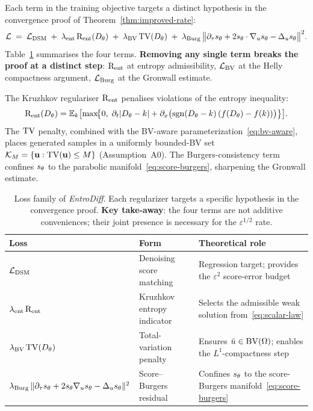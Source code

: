 Each term in the training objective targets a distinct hypothesis in the convergence proof of Theorem~\ref{thm:improved-rate}:
\begin{equation}
  \label{eq:loss-final}
  \mathcal{L} \;=\;
    \mathcal{L}_{\mathrm{DSM}}
    \;+\;
    \lambda_{\mathrm{ent}}\,\mathrm{R}_{\mathrm{ent}}(D_{\theta})
    \;+\;
    \lambda_{\mathrm{BV}}\,\mathrm{TV}(D_{\theta})
    \;+\;
    \lambda_{\mathrm{Burg}}\,
      \bigl\|\partial_{\tau}s_{\theta} + 2s_{\theta}\cdot\nabla_{u}s_{\theta} - \Delta_{u}s_{\theta}\bigr\|^{2}.
\end{equation}
Table~\ref{tab:loss-family} summarises the four terms. \textbf{Removing any single term breaks the proof at a distinct step}: $\mathrm{R}_{\mathrm{ent}}$ at entropy admissibility, $\mathcal{L}_{\mathrm{BV}}$ at the Helly compactness argument, $\mathcal{L}_{\mathrm{Burg}}$ at the Gronwall estimate.

The Kruzhkov regulariser $\mathrm{R}_{\mathrm{ent}}$ penalises violations of the entropy inequality:
\begin{equation}
  \label{eq:rent-def}
  \mathrm{R}_{\mathrm{ent}}(D_{\theta}) = \mathbb{E}_{k}\bigl[
    \max\!\bigl\{0,\;
      \partial_{t}\lvert D_{\theta}-k \rvert
      + \partial_{x}\bigl(\operatorname{sgn}(D_{\theta}-k)\,(f(D_{\theta})-f(k))\bigr)
    \bigr\}
  \bigr].
\end{equation}
The $\mathrm{TV}$ penalty, combined with the BV-aware parameterization~\eqref{eq:bv-aware}, places generated samples in a uniformly bounded-{BV} set $\mathcal{K}_{M}=\{\mathbf{u}:\mathrm{TV}(\mathbf{u})\le M\}$ (Assumption~A0). The Burgers-consistency term confines $s_{\theta}$ to the parabolic manifold~\eqref{eq:score-burgers}, sharpening the Gronwall estimate.

\begin{table}[t]
    \caption{Loss family of \emph{EntroDiff}. Each regularizer targets a specific hypothesis in the convergence proof. \textbf{Key take-away}: the four terms are not additive conveniences; their joint presence is necessary for the $\varepsilon^{1/2}$ rate.}
    \label{tab:loss-family}
    \centering
    \begin{tabularx}{\textwidth}{llX}
        \toprule
        Loss & Form & Theoretical role \\
        \midrule
        $\mathcal{L}_{\mathrm{DSM}}$
            & Denoising score matching
            & Regression target; provides the $\varepsilon^{2}$ score-error budget \\
        $\lambda_{\mathrm{ent}}\,\mathrm{R}_{\mathrm{ent}}$
            & Kruzhkov entropy indicator
            & Selects the admissible weak solution from~\eqref{eq:scalar-law} \\
        $\lambda_{\mathrm{BV}}\,\mathrm{TV}(D_{\theta})$
            & Total-variation penalty
            & Ensures $\hat u\in\mathrm{BV}(\Omega)$; enables the $L^{1}$-compactness step \\
        $\lambda_{\mathrm{Burg}}\,\lVert \partial_{\tau}s_{\theta} + 2s_{\theta}\nabla_{u}s_{\theta} - \Delta_{u}s_{\theta} \rVert^{2}$
            & Score--Burgers residual
            & Confines $s_{\theta}$ to the score-Burgers manifold~\eqref{eq:score-burgers} \\
        \bottomrule
    \end{tabularx}
\end{table}

